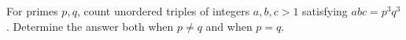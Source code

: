For primes $p,q$, count unordered triples of integers $a,b,c>1$ satisfying $abc=p^3q^3$. Determine the answer both when $p\ne q$ and when $p=q$.
